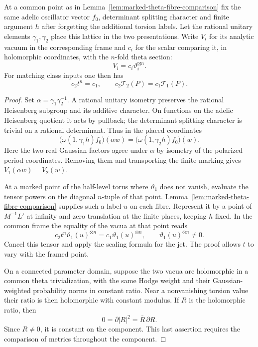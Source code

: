 \begin{auxlemma}\label{lem:marked-vacuum-scalar}
At a common point as in Lemma~\ref{lem:marked-theta-fibre-comparison}
fix the same adelic oscillator vector \(f_0\), determinant
splitting character and finite argument \(h\) after forgetting
the additional torsion labels. Let the rational unitary elements
\(\gamma_1,\gamma_2\) place this lattice in the two presentations.
Write \(V_i\) for its analytic vacuum in the corresponding frame
and \(c_i\) for the scalar comparing it, in holomorphic coordinates,
with the \(n\)-fold theta section:
\[
                  V_i=c_i\vartheta_i^{\boxtimes n}.
\]
For matching class inputs one then has
\[
     c_2t^n=c_1,\qquad c_2\mathcal T_2(P)=c_1\mathcal T_1(P).
\]
\end{auxlemma}
\begin{proof}
Set \(\alpha=\gamma_1\gamma_2^{-1}\). A rational unitary isometry
preserves the rational Heisenberg subgroup and its additive
character. On functions on the adelic Heisenberg quotient it
acts by pullback; the determinant splitting character is trivial
on a rational determinant. Thus in the placed coordinates
\[
  \bigl(\omega(1,\gamma_1 h)f_0\bigr)(\alpha w)
     =\bigl(\omega(1,\gamma_2 h)f_0\bigr)(w).
\]
Here the two real Gaussian factors agree under \(\alpha\) by
isometry of the polarized period coordinates. Removing them and
transporting the finite marking gives \(V_1(\alpha w)=V_2(w)\).

At a marked point of the half-level torus where \(\vartheta_1\)
does not vanish, evaluate the tensor powers on the diagonal
\(n\)-tuple of that point. Lemma~\ref{lem:marked-theta-fibre-comparison}
supplies such a label \(u\) on each fibre. Represent it by a point of \(M^{-1}L'\) at infinity and zero translation at the finite places, keeping \(h\) fixed. In the common frame the equality of the vacua at that point reads
\[
 c_2 t^n\vartheta_1(u)^{\otimes n}=c_1\vartheta_1(u)^{\otimes n},
 \qquad \vartheta_1(u)^{\otimes n}\ne0 .
\]
Cancel this tensor and apply the scaling formula for the jet.
The proof allows \(t\) to vary with the framed point.

On a connected parameter domain, suppose the two vacua are
holomorphic in a common theta trivialization, with the same Hodge
weight and their Gaussian-weighted probability norms in constant
ratio. Near a nonvanishing torsion value their ratio is then
holomorphic with constant modulus. If \(R\) is the holomorphic ratio, then
\[
             0=\partial |R|^2=\bar R\,\partial R.
\]
Since \(R\ne0\), it is constant on the component. This last assertion requires the
comparison of metrics throughout the component.
\end{proof}

